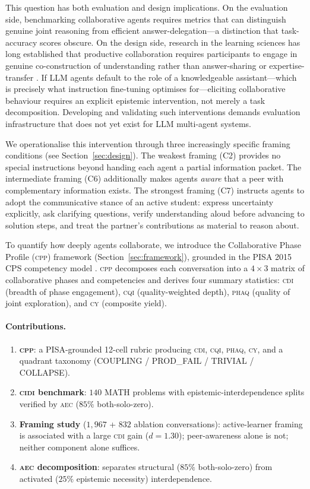\documentclass{article}
\newcommand{\CDI}{\textsc{cdi}}
\newcommand{\CQI}{\textsc{cqi}}
\newcommand{\PhAQ}{\textsc{phaq}}
\newcommand{\CY}{\textsc{cy}}
\newcommand{\CPP}{\textsc{cpp}}
\newcommand{\CIDI}{\textsc{cidi}}
\newcommand{\AEC}{\textsc{aec}}
\begin{document}
This question has both evaluation and design implications. On the
evaluation side, benchmarking collaborative agents requires metrics
that can distinguish genuine joint reasoning from efficient
answer-delegation---a distinction that task-accuracy scores obscure.
On the design side, research in the learning sciences has long
established that productive collaboration requires participants to
engage in genuine co-construction of understanding rather than
answer-sharing or expertise-transfer
\citep{roschelle1995construction, dillenbourg1999collaborative}.
If LLM agents default to the role of a knowledgeable assistant---which
is precisely what instruction fine-tuning optimises for---eliciting
collaborative behaviour requires an explicit epistemic intervention,
not merely a task decomposition. Developing and validating such
interventions demands evaluation infrastructure that does not yet
exist for LLM multi-agent systems.

We operationalise this intervention through three increasingly
specific framing conditions (see Section~\ref{sec:design}). The
weakest framing (C2) provides no special instructions beyond
handing each agent a partial information packet. The intermediate
framing (C6) additionally makes agents \emph{aware} that a
peer with complementary information exists. The strongest framing (C7) instructs agents to adopt the
communicative stance of an active student: express uncertainty
explicitly, ask clarifying questions, verify understanding aloud before
advancing to solution steps, and treat the partner's contributions as
material to reason about.

To quantify how deeply agents collaborate, we introduce the
Collaborative Phase Profile (\CPP) framework
(Section~\ref{sec:framework}), grounded in the PISA 2015 CPS
competency model \citep{pisa2015cps}. \CPP{} decomposes each
conversation into a $4 \times 3$ matrix of collaborative phases and
competencies and derives four summary statistics: \CDI{} (breadth of
phase engagement), \CQI{} (quality-weighted depth), \PhAQ{} (quality
of joint exploration), and \CY{} (composite yield).

\paragraph{Contributions.}
\begin{enumerate}
    \item \textbf{\CPP}: a PISA-grounded 12-cell rubric producing \CDI, \CQI, \PhAQ, \CY, and a quadrant taxonomy (COUPLING / PROD\_FAIL / TRIVIAL / COLLAPSE).
    \item \textbf{\CIDI{} benchmark}: $140$ MATH problems with epistemic-interdependence splits verified by \AEC{} ($85\%$ both-solo-zero).
    \item \textbf{Framing study} ($1{,}967$ + $832$ ablation conversations): active-learner framing is associated with a large \CDI{} gain ($d=1.30$); peer-awareness alone is not; neither component alone suffices.
    \item \textbf{\AEC{} decomposition}: separates structural ($85\%$ both-solo-zero) from activated ($25\%$ epistemic necessity) interdependence.
\end{enumerate}
\end{document}
